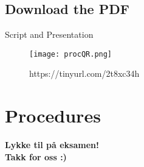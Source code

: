\begin{frame}[t,plain]
    \titlepage
\end{frame}




\subsection*{Download the PDF}
\begin{frame}{Script and Presentation}
    \begin{figure}
        \centering
        \texttt{[image: procQR.png]}
        \caption{https://tinyurl.com/2t8xc34h}
        \label{fig:qrcode}
    \end{figure}
\end{frame}


%
\section{Procedures}



\begin{frame}
\begin{center}
\begin{Large}
\textbf{Lykke til på eksamen!\\[5mm]
Takk for oss :)}

\end{Large}
\end{center}  
\end{frame}